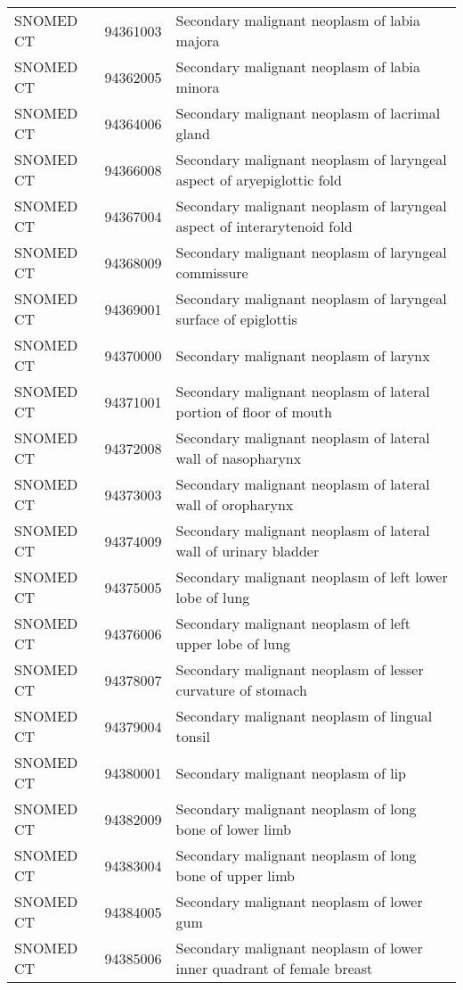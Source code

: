 \begin{longtable}{p{}p{}p{}}
  SNOMED CT & 94361003 & Secondary malignant neoplasm of labia majora \\ 
  SNOMED CT & 94362005 & Secondary malignant neoplasm of labia minora \\ 
  SNOMED CT & 94364006 & Secondary malignant neoplasm of lacrimal gland \\ 
  SNOMED CT & 94366008 & Secondary malignant neoplasm of laryngeal aspect of aryepiglottic fold \\ 
  SNOMED CT & 94367004 & Secondary malignant neoplasm of laryngeal aspect of interarytenoid fold \\ 
  SNOMED CT & 94368009 & Secondary malignant neoplasm of laryngeal commissure \\ 
  SNOMED CT & 94369001 & Secondary malignant neoplasm of laryngeal surface of epiglottis \\ 
  SNOMED CT & 94370000 & Secondary malignant neoplasm of larynx \\ 
  SNOMED CT & 94371001 & Secondary malignant neoplasm of lateral portion of floor of mouth \\ 
  SNOMED CT & 94372008 & Secondary malignant neoplasm of lateral wall of nasopharynx \\ 
  SNOMED CT & 94373003 & Secondary malignant neoplasm of lateral wall of oropharynx \\ 
  SNOMED CT & 94374009 & Secondary malignant neoplasm of lateral wall of urinary bladder \\ 
  SNOMED CT & 94375005 & Secondary malignant neoplasm of left lower lobe of lung \\ 
  SNOMED CT & 94376006 & Secondary malignant neoplasm of left upper lobe of lung \\ 
  SNOMED CT & 94378007 & Secondary malignant neoplasm of lesser curvature of stomach \\ 
  SNOMED CT & 94379004 & Secondary malignant neoplasm of lingual tonsil \\ 
  SNOMED CT & 94380001 & Secondary malignant neoplasm of lip \\ 
  SNOMED CT & 94382009 & Secondary malignant neoplasm of long bone of lower limb \\ 
  SNOMED CT & 94383004 & Secondary malignant neoplasm of long bone of upper limb \\ 
  SNOMED CT & 94384005 & Secondary malignant neoplasm of lower gum \\ 
  SNOMED CT & 94385006 & Secondary malignant neoplasm of lower inner quadrant of female breast \\ 

\end{longtable}
